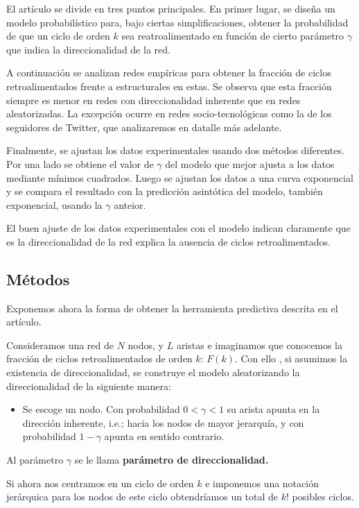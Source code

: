 \documentclass[1p]{elsarticle}
\begin{document}
    El artículo se divide en tres puntos principales.
    En primer lugar, se diseña un modelo probabilístico para, bajo ciertas simplificaciones, obtener la probabilidad de que un ciclo de orden $k$ sea reatroalimentado en función de cierto parámetro $\gamma$ que indica la direccionalidad de la red.

    A continuación se analizan redes empíricas para obtener la fracción de ciclos retroalimentados frente a estructurales en estas.
    Se observa que esta fracción siempre es menor en redes con direccionalidad inherente que en redes aleatorizadas. 
    La excepción ocurre en redes socio-tecnológicas como la de los seguidores de Twitter, que analizaremos en datalle más adelante.
    
    Finalmente, se ajustan los datos experimentales usando dos métodos diferentes.
    Por una lado se obtiene el valor de $\gamma$ del modelo que mejor ajusta a los datos mediante mínimos cuadrados.
    Luego se ajustan los datos a una curva exponencial y se compara el resultado con la predicción asintótica del modelo, también exponencial, usando la $\gamma$ anteior.

    El buen ajuste de los datos experimentales con el modelo indican claramente que es la direccionalidad de la red explica la ausencia de ciclos retroalimentados.


\subsection{Métodos}
    Exponemos ahora la forma de obtener la herramienta predictiva descrita en el artículo.

    Consideramos una red de $N$ nodos, y $L$ aristas e imaginamos que conocemos la fracción de ciclos retroalimentados de orden $k$: $F(k)$. Con ello , si asumimos la existencia de direccionalidad, se construye el modelo aleatorizando la direccionalidad de la siguiente manera: 
\begin{itemize}
	\item Se escoge un nodo. Con probabilidad $0<\gamma<1$ su arista apunta en la dirección inherente, i.e.; hacia los nodos de mayor jerarquía, y con probabilidad $1-\gamma$ apunta en sentido contrario.
\end{itemize}
Al parámetro $\gamma$ se le llama \textbf{parámetro de direccionalidad.}

Si ahora nos centramos en un ciclo de orden $k$ e imponemos una notación jerárquica para los nodos de este ciclo obtendríamos un total de $k!$ posibles ciclos. 
\end{document}
